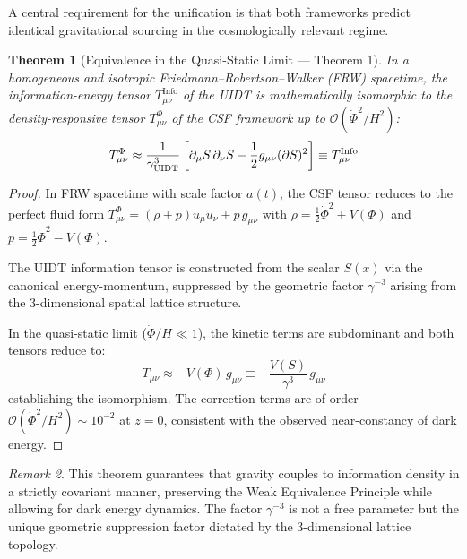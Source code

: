 \documentclass[12pt,a4paper,twoside]{article}
\theoremstyle{plain}
\newtheorem{theorem}{Theorem}[section]
\theoremstyle{definition}
\theoremstyle{remark}
\newtheorem{remark}[theorem]{Remark}
\newcommand{\UIDT}{\textsc{UIDT}}
\newcommand{\CSF}{\textsc{CSF}}
\begin{document}
A central requirement for the unification is that both frameworks predict
identical gravitational sourcing in the cosmologically relevant regime.

\begin{theorem}[Equivalence in the Quasi-Static Limit --- Theorem 1]
\label{thm:tensor_equivalence}
In a homogeneous and isotropic Friedmann--Robertson--Walker (FRW)
spacetime, the information-energy tensor $T_{\mu\nu}^{\mathrm{Info}}$ of
the \UIDT{} is mathematically isomorphic to the density-responsive tensor
$T_{\mu\nu}^{\Phi}$ of the \CSF{} framework up to
$\mathcal{O}(\dot{\Phi}^2/H^2)$:
\begin{equation}
    T_{\mu\nu}^{\Phi} \approx \frac{1}{\gamma_{\UIDT}^3}
    \left[ \partial_\mu S \, \partial_\nu S
    - \frac{1}{2}g_{\mu\nu}(\partial S)^2 \right]
    \equiv T_{\mu\nu}^{\mathrm{Info}}
    \label{eq:tensor_equivalence}
\end{equation}
\end{theorem}

\begin{proof}
In FRW spacetime with scale factor $a(t)$, the \CSF{} tensor reduces to
the perfect fluid form $T_{\mu\nu}^{\Phi} = (\rho + p)u_\mu u_\nu + p\,g_{\mu\nu}$
with $\rho = \frac{1}{2}\dot{\Phi}^2 + V(\Phi)$ and
$p = \frac{1}{2}\dot{\Phi}^2 - V(\Phi)$.

The \UIDT{} information tensor is constructed from the scalar $S(x)$ via
the canonical energy-momentum, suppressed by the geometric factor
$\gamma^{-3}$ arising from the 3-dimensional spatial lattice structure.

In the quasi-static limit ($\dot{\Phi}/H \ll 1$), the kinetic terms are
subdominant and both tensors reduce to:
\begin{equation}
    T_{\mu\nu} \approx -V(\Phi)\,g_{\mu\nu} \equiv
    -\frac{V(S)}{\gamma^3}\,g_{\mu\nu}
\end{equation}
establishing the isomorphism. The correction terms are of order
$\mathcal{O}(\dot{\Phi}^2/H^2) \sim 10^{-2}$ at $z = 0$, consistent
with the observed near-constancy of dark energy.
\end{proof}

\begin{remark}
This theorem guarantees that gravity couples to information density in a
strictly covariant manner, preserving the Weak Equivalence Principle while
allowing for dark energy dynamics. The factor $\gamma^{-3}$ is not a free
parameter but the unique geometric suppression factor dictated by the
3-dimensional lattice topology.
\end{remark}
\end{document}
